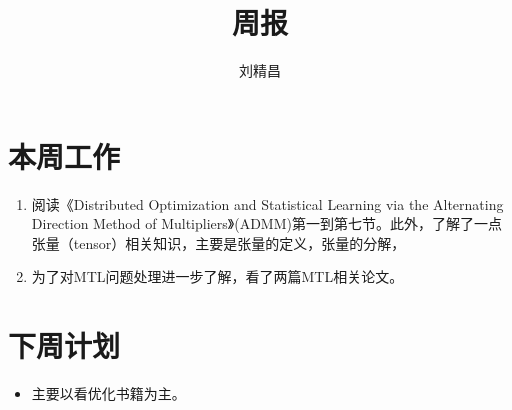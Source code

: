 \documentclass{ctexart}
\begin{document}
\title{周报}
\author{刘精昌}
\maketitle
\fangsong

\section*{本周工作}
\begin{enumerate}
  \item 阅读《Distributed Optimization and Statistical Learning via the Alternating Direction Method of Multipliers》(ADMM)第一到第七节。此外，了解了一点张量（tensor）相关知识，主要是张量的定义，张量的分解，
  \item 为了对MTL问题处理进一步了解，看了两篇MTL相关论文。
\end{enumerate}

\section*{下周计划}
\begin{itemize}
  \item 主要以看优化书籍为主。
\end{itemize}
\end{document}

